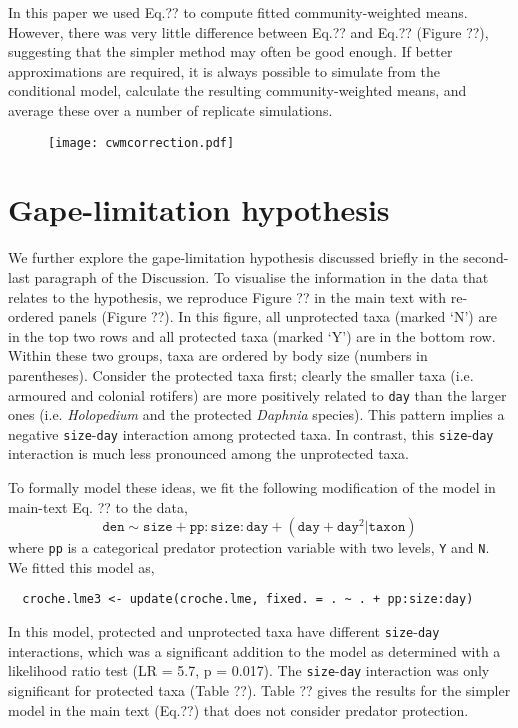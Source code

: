 \documentclass[12pt]{ecologyFORAPPENDIX}
\newcommand{\processfloatnow}{
	\begingroup
	\let\cleardoublepage\relax
	\let\clearpage\relax
	\processdelayedfloats
	\endgroup
}
\begin{document}
In this paper we used Eq.?? to compute fitted community-weighted means.  However, there was very little difference between Eq.?? and Eq.?? (Figure ??), suggesting that the simpler method may often be good enough.  If better approximations are required, it is always possible to simulate from the conditional model, calculate the resulting community-weighted means, and average these over a number of replicate simulations.

\begin{figure}
\texttt{[image: cwmcorrection.pdf]}
\caption{}
\label{fig:cwmcorrection}
\end{figure}
\processfloatnow

\section{Gape-limitation hypothesis}

We further explore the gape-limitation hypothesis discussed briefly in the second-last paragraph of the Discussion.  To visualise the information in the data that relates to the hypothesis, we reproduce Figure ?? in the main text with re-ordered panels (Figure ??).  In this figure, all unprotected taxa (marked `N') are in the top two rows and all protected taxa (marked `Y') are in the bottom row.  Within these two groups, taxa are ordered by body size (numbers in parentheses).  Consider the protected taxa first; clearly the smaller taxa (i.e. armoured and colonial rotifers) are more positively related to \texttt{day} than the larger ones (i.e. \emph{Holopedium} and the protected \emph{Daphnia} species).  This pattern implies a negative \texttt{size}-\texttt{day} interaction among protected taxa.  In contrast, this \texttt{size}-\texttt{day} interaction is much less pronounced among the unprotected taxa.

To formally model these ideas, we fit the following modification of the model in main-text Eq. ?? to the data,
\begin{equation}
\mathtt{den} \sim \mathtt{size} + \mathtt{pp}:\mathtt{size}:\mathtt{day} + (\mathtt{day} + \mathtt{day}^2 | \mathtt{taxon})
\label{eq:fdminteraction}
\end{equation}
where \texttt{pp} is a categorical predator protection variable with two levels, \texttt{Y} and \texttt{N}.  We fitted this model as,
\begin{verbatim} 
  croche.lme3 <- update(croche.lme, fixed. = . ~ . + pp:size:day) 
\end{verbatim} 
In this model, protected and unprotected taxa have different \texttt{size}-\texttt{day} interactions, which was a significant addition to the model as determined with a likelihood ratio test (LR = 5.7, p = 0.017).  The \texttt{size}-\texttt{day} interaction was only significant for protected taxa (Table ??).  Table ?? gives the results for the simpler model in the main text (Eq.??) that does not consider predator protection.
\end{document}
